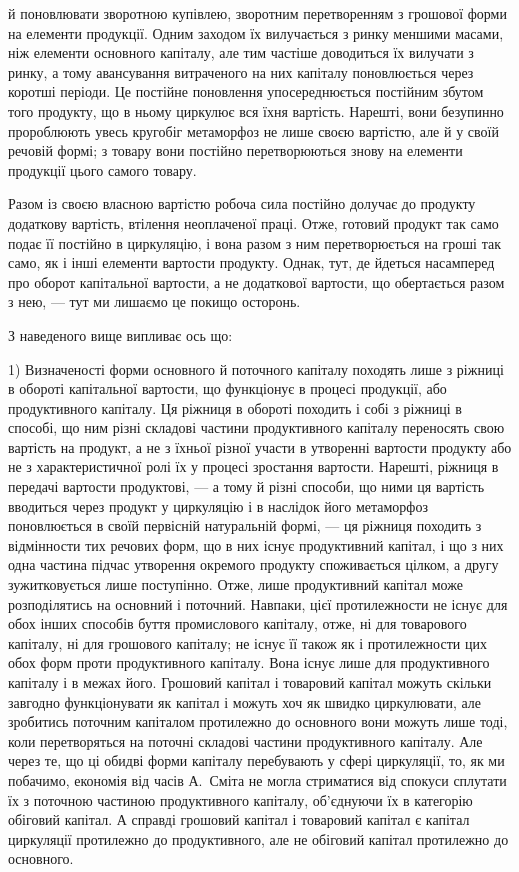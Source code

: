 \parcont{}  %
й поновлювати зворотною купівлею, зворотним перетворенням з грошової форми на елементи продукції.
Одним заходом їх вилучається з ринку меншими масами, ніж елементи основного капіталу, але тим
частіше доводиться їх вилучати з ринку, а тому авансування витраченого на них капіталу поновлюється
через коротші періоди. Це постійне поновлення упосереднюється постійним збутом того продукту, що в
ньому циркулює вся їхня вартість. Нарешті, вони безупинно пророблюють увесь кругобіг метаморфоз не
лише своєю вартістю, але й у своїй речовій формі; з товару вони постійно перетворюються знову на
елементи продукції цього самого товару.

Разом із своєю власною вартістю робоча сила постійно долучає до продукту додаткову вартість,
втілення неоплаченої праці. Отже, готовий продукт так само подає її постійно в циркуляцію, і вона
разом з ним перетворюється на гроші так само, як і інші елементи вартости продукту. Однак, тут, де
йдеться насамперед про оборот капітальної вартости, а не додаткової вартости, що обертається разом з
нею, — тут ми лишаємо це покищо осторонь.

З наведеного вище випливає ось що:

1) Визначеності форми основного й поточного капіталу походять лише з ріжниці в обороті капітальної
вартости, що функціонує в процесі продукції, або продуктивного капіталу. Ця ріжниця в обороті
походить і собі з ріжниці в способі, що ним різні складові частини продуктивного капіталу переносять
свою вартість на продукт, а не з їхньої різної участи в утворенні вартости продукту або не з
характеристичної ролі їх у процесі зростання вартости. Нарешті, ріжниця в передачі вартости
продуктові, — а тому й різні способи, що ними ця вартість вводиться через продукт у циркуляцію і в
наслідок його метаморфоз поновлюється в своїй первісній натуральній формі, — ця ріжниця походить з
відмінности тих речових форм, що в них існує продуктивний капітал, і що з них одна частина підчас
утворення окремого продукту споживається цілком, а другу зужитковується лише поступінно. Отже, лише
продуктивний капітал може розподілятись на основний і поточний. Навпаки, цієї протилежности не існує
для обох інших способів буття промислового капіталу, отже, ні для товарового капіталу, ні для
грошового капіталу; не існує її також як і протилежности цих обох форм проти продуктивного капіталу.
Вона існує лише для продуктивного капіталу і в межах його. Грошовий капітал і товаровий капітал
можуть скільки завгодно функціонувати як капітал і можуть хоч як швидко циркулювати, але зробитись
поточним капіталом протилежно до основного вони можуть лише тоді, коли перетворяться на поточні
складові частини продуктивного капіталу. Але через те, що ці обидві форми капіталу перебувають у
сфері циркуляції, то, як ми побачимо, економія від часів А.~Сміта не могла стриматися від спокуси
сплутати їх з поточною частиною продуктивного капіталу, об’єднуючи їх в категорію обіговий капітал.
А справді грошовий капітал і товаровий капітал є капітал циркуляції протилежно до продуктивного, але
не обіговий капітал протилежно до основного.
